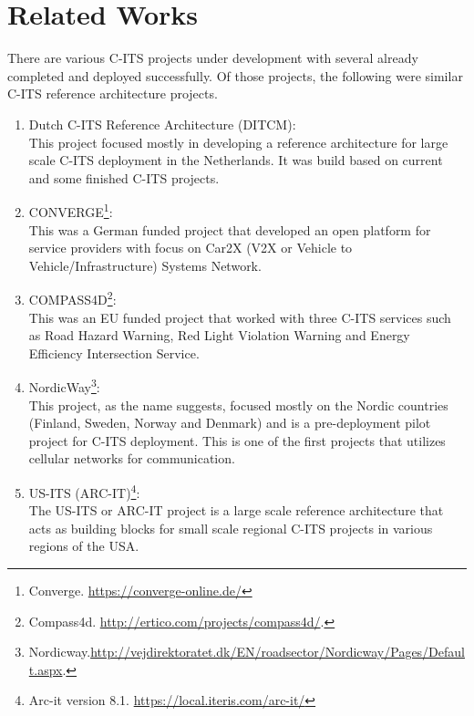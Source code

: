 \documentclass[conference]{IEEEtran}
\begin{document}
\section{Related Works}
There are various C-ITS projects under development with several already completed and deployed successfully. Of those projects, the following were similar C-ITS reference architecture projects.

\begin{enumerate}
	\item Dutch C-ITS Reference Architecture (DITCM)\cite{ditcm}\cite{ditcmits}:\\
		This project focused mostly in developing a reference architecture for large scale C-ITS deployment in the Netherlands. It was build based on current and some finished C-ITS projects.
	\item CONVERGE\footnote{\label{converge}Converge. \url{https://converge-online.de/}}: \\
		This was a German funded project that developed an open platform for service providers with focus on Car2X (V2X or Vehicle to Vehicle/Infrastructure) Systems Network.
	\item COMPASS4D\footnote{\label{compass4d}Compass4d. \url{http://ertico.com/projects/compass4d/}.}:\\
	This was an EU funded project that worked with three C-ITS services such as Road Hazard Warning, Red Light Violation Warning and Energy Efficiency Intersection Service.
	\item NordicWay\footnote{\label{nordicway}Nordicway.\url{http://vejdirektoratet.dk/EN/roadsector/Nordicway/Pages/Default.aspx}.}:\\
	This project, as the name suggests, focused mostly on the Nordic countries (Finland, Sweden, Norway and Denmark) and is a pre-deployment pilot project for  C-ITS deployment. This is one of the first projects that utilizes cellular networks for communication.
	\item US-ITS (ARC-IT)\footnote{\label{arcit}Arc-it version 8.1. \url{https://local.iteris.com/arc-it/}}:\\
	The US-ITS or ARC-IT project is a large scale reference architecture that acts as building blocks for small scale regional C-ITS projects in various regions of the USA.

\end{enumerate}
\end{document}
